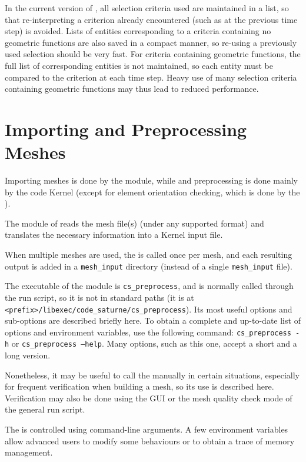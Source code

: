 {{{In the current version of \CS, all selection criteria used
are maintained in a list, so that re-interpreting a criterion already
encountered (such as at the previous time step) is avoided.
Lists of entities corresponding to a criteria containing no geometric
functions are also saved in a compact manner, so re-using a previously
used selection should be very fast. For criteria containing geometric
functions, the full list of corresponding entities is not maintained,
so each entity must be compared to the criterion at each time step.
Heavy use of many selection criteria containing geometric functions
may thus lead to reduced performance.

\section{Importing and Preprocessing Meshes}

Importing meshes is done by the \pcs module, while and preprocessing
is done mainly by the code Kernel (except for element orientation
checking, which is done by the \pcs).

The \pcs module of \CS reads the
mesh file(s) (under any supported format) and translates the necessary
information into a Kernel input file.

When multiple meshes are used, the \pcs is called once per mesh,
and each resulting output is added in a \texttt{mesh\_input}
directory (instead of a single \texttt{mesh\_input} file).

The executable of the \pcs module is \texttt{cs\_preprocess}, and
is normally called through the run script, so it is not in standard paths
(it is at \texttt{<prefix>/libexec/code\_saturne/cs\_preprocess}).
Its most useful options and sub-options are described briefly here.
To obtain a complete and up-to-date list of options and environment
variables, use the following command:
\texttt{cs\_preprocess~-h} or \texttt{cs\_preprocess~--help}.
Many options, such as this one, accept a short and a long version.

Nonetheless, it may be useful to call the \pcs manually
in certain situations, especially for frequent verification when
building a mesh, so its use is described here. Verification
may also be done using the GUI or the mesh quality check mode
of the general run script.

The \pcs is controlled using command-line arguments.
A few environment variables allow advanced users to modify
some behaviours or to obtain a trace of memory management.

}}}
